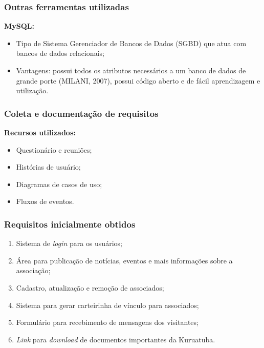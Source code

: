 \documentclass[xcolor=table]{beamer}
\begin{document}
\begin{frame}
    \frametitle{Outras ferramentas utilizadas}
    \textbf{MySQL:} 
    \begin{itemize}
        \item Tipo de Sistema Gerenciador de Bancos de Dados (SGBD) que atua com bancos de dados relacionais; %
        \item Vantagens: possui todos os atributos necessários a um banco de dados de grande porte (MILANI, 2007), possui código aberto e de fácil aprendizagem e utilização. 
    \end{itemize}
    
\end{frame}



\begin{frame}
    \frametitle{Coleta e documentação de requisitos}
    \textbf{Recursos utilizados:}
    \begin{itemize}
        \item Questionário e reuniões;
        \item Histórias de usuário;
        \item Diagramas de casos de uso;
        \item Fluxos de eventos.
    \end{itemize}
\end{frame}

\begin{frame}
    \frametitle{Requisitos inicialmente obtidos} %
    \begin{enumerate}
     \item Sistema de \textit{login} para os usuários;
     \item Área para publicação de notícias, eventos e mais informações sobre a associação;
     \item Cadastro, atualização e remoção de associados;
     \item Sistema para gerar carteirinha de vínculo para associados;
     \item Formulário para recebimento de mensagens dos visitantes;
     \item \textit{Link} para \textit{download} de documentos importantes da Kuruatuba.
    \end{enumerate}

\end{frame}
\end{document}

